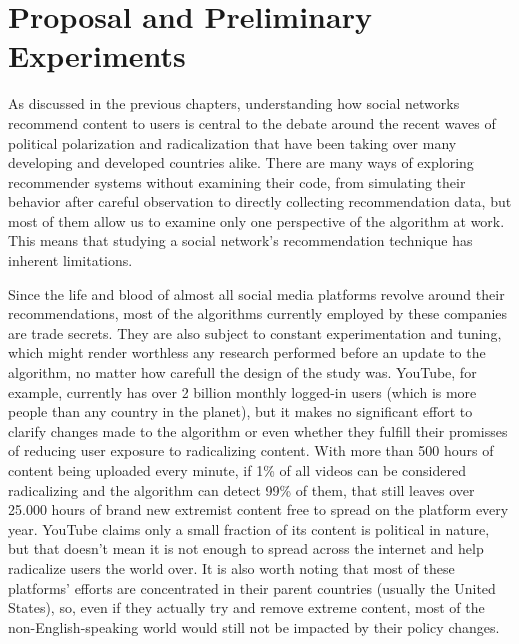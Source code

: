 





\chapter{Proposal and Preliminary Experiments}
\label{cap:proposal}

As discussed in the previous chapters, understanding how social networks
recommend content to users is central to the debate around the recent waves of
political polarization and radicalization that have been taking over many
developing and developed countries alike. There are many ways of exploring
recommender systems without examining their code, from simulating their behavior
after careful observation to directly collecting recommendation data, but most
of them allow us to examine only one perspective of the algorithm at work. This
means that studying a social network's recommendation technique has inherent
limitations.

Since the life and blood of almost all social media platforms revolve around
their recommendations, most of the algorithms currently employed by these
companies are trade secrets. They are also subject to constant experimentation
and tuning, which might render worthless any research performed before an update
to the algorithm, no matter how carefull the design of the study was. YouTube,
for example, currently has over 2 billion monthly logged-in users (which is more
people than any country in the planet), but it makes no significant effort to
clarify changes made to the algorithm or even whether they fulfill their
promisses of reducing user exposure to radicalizing content. With more than 500
hours of content being uploaded every minute, if 1\% of all videos can be
considered radicalizing and the algorithm can detect 99\% of them, that still
leaves over 25.000 hours of brand new extremist content free to spread on the
platform every year. YouTube claims only a small fraction of its content is
political in nature, but that doesn't mean it is not enough to spread across the
internet and help radicalize users the world over. It is also worth noting that
most of these platforms' efforts are concentrated in their parent countries
(usually the United States), so, even if they actually try and remove extreme
content, most of the non-English-speaking world would still not be impacted by
their policy changes.

